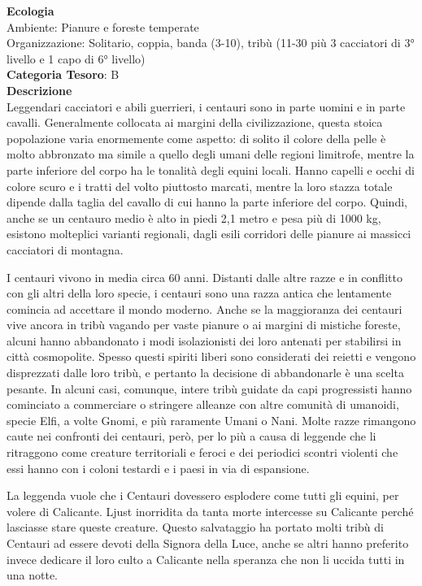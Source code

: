 \begin{multicols}{2}
{\textbf{Ecologia}\\
Ambiente: Pianure e foreste temperate\\
Organizzazione: Solitario, coppia, banda (3-10), tribù (11-30 più 3 cacciatori di 3° livello e 1 capo di 6° livello)\\
\textbf{Categoria Tesoro}: B\\
\textbf{Descrizione}\\
Leggendari cacciatori e abili guerrieri, i centauri sono in parte uomini e in parte cavalli. Generalmente collocata ai margini della civilizzazione, questa stoica popolazione varia enormemente come aspetto: di solito il colore della pelle è molto abbronzato ma simile a quello degli umani delle regioni limitrofe, mentre la parte inferiore del corpo ha le tonalità degli equini locali. Hanno capelli e occhi di colore scuro e i tratti del volto piuttosto marcati, mentre la loro stazza totale dipende dalla taglia del cavallo di cui hanno la parte inferiore del corpo. Quindi, anche se un centauro medio è alto in piedi 2,1 metro e pesa più di 1000 kg, esistono molteplici varianti regionali, dagli esili corridori delle pianure ai massicci cacciatori di montagna.

I centauri vivono in media circa 60 anni. Distanti dalle altre razze e in conflitto con gli altri della loro specie, i centauri sono una razza antica che lentamente comincia ad accettare il mondo moderno. Anche se la maggioranza dei centauri vive ancora in tribù vagando per vaste pianure o ai margini di mistiche foreste, alcuni hanno abbandonato i modi isolazionisti dei loro antenati per stabilirsi in città cosmopolite. Spesso questi spiriti liberi sono considerati dei reietti e vengono disprezzati dalle loro tribù, e pertanto la decisione di abbandonarle è una scelta pesante. In alcuni casi, comunque, intere tribù guidate da capi progressisti hanno cominciato a commerciare o stringere alleanze con altre comunità di umanoidi, specie Elfi, a volte Gnomi, e più raramente Umani o Nani. Molte razze rimangono caute nei confronti dei centauri, però, per lo più a causa di leggende che li ritraggono come creature territoriali e feroci e dei periodici scontri violenti che essi hanno con i coloni testardi e i paesi in via di espansione.

La leggenda vuole che i Centauri dovessero esplodere come tutti gli equini, per volere di Calicante. Ljust inorridita da tanta morte intercesse su Calicante perché lasciasse stare queste creature. Questo salvataggio ha portato molti tribù di Centauri ad essere devoti della Signora della Luce, anche se altri hanno preferito invece dedicare il loro culto a Calicante nella speranza che non li uccida tutti in una notte.

}
\end{multicols}
